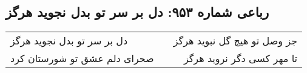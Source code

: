\begin{center}
\section*{رباعی شماره ۹۵۳: دل بر سر تو بدل نجوید هرگز}
\label{sec:0953}
\begin{longtable}{l p{0.5cm} r}
دل بر سر تو بدل نجوید هرگز
&&
جز وصل تو هیچ گل نبوید هرگز
\\
صحرای دلم عشق تو شورستان کرد
&&
تا مهر کسی دگر نروید هرگز
\\
\end{longtable}
\end{center}
